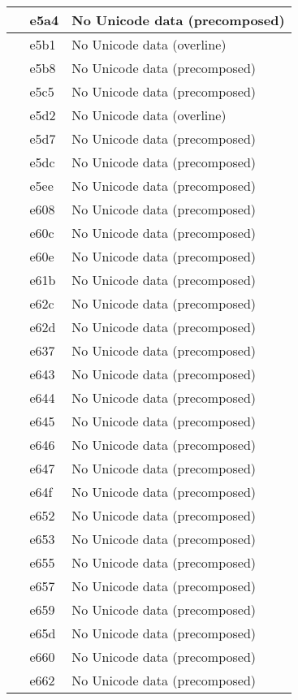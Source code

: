 \documentclass[12pt,letterpaper,openany]{book}
\begin{document}
\begin{center}
\begin{supertabular}{|m{0.25in}|m{0.5in}|m{4in}|}
			 & e5a4 & No Unicode data (precomposed)\\\hline
			 & e5b1 & No Unicode data (overline)\\\hline
			 & e5b8 & No Unicode data (precomposed)\\\hline
			 & e5c5 & No Unicode data (precomposed)\\\hline
			 & e5d2 & No Unicode data (overline)\\\hline
			 & e5d7 & No Unicode data (precomposed)\\\hline
			 & e5dc & No Unicode data (precomposed)\\\hline
			 & e5ee & No Unicode data (precomposed)\\\hline
			 & e608 & No Unicode data (precomposed)\\\hline
			 & e60c & No Unicode data (precomposed)\\\hline
			 & e60e & No Unicode data (precomposed)\\\hline
			 & e61b & No Unicode data (precomposed)\\\hline
			 & e62c & No Unicode data (precomposed)\\\hline
			 & e62d & No Unicode data (precomposed)\\\hline
			 & e637 & No Unicode data (precomposed)\\\hline
			 & e643 & No Unicode data (precomposed)\\\hline
			 & e644 & No Unicode data (precomposed)\\\hline
			 & e645 & No Unicode data (precomposed)\\\hline
			 & e646 & No Unicode data (precomposed)\\\hline
			 & e647 & No Unicode data (precomposed)\\\hline
			 & e64f & No Unicode data (precomposed)\\\hline
			 & e652 & No Unicode data (precomposed)\\\hline
			 & e653 & No Unicode data (precomposed)\\\hline
			 & e655 & No Unicode data (precomposed)\\\hline
			 & e657 & No Unicode data (precomposed)\\\hline
			 & e659 & No Unicode data (precomposed)\\\hline
			 & e65d & No Unicode data (precomposed)\\\hline
			 & e660 & No Unicode data (precomposed)\\\hline
			 & e662 & No Unicode data (precomposed)\\\hline

\end{supertabular}
\end{center}
\end{document}
